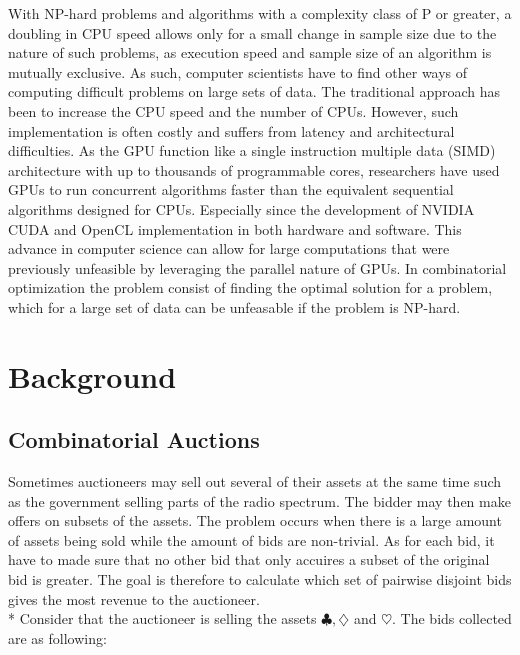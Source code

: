 \documentclass[a4paper, 12pt]{report}
\begin{document}
With NP-hard problems and algorithms with a complexity class of P or greater, 
a doubling in CPU speed allows only for a small change in sample size due to the nature of such problems, 
as execution speed and sample size of an algorithm is mutually exclusive.
As such, computer scientists have to find other ways of computing difficult problems on large sets of data.
The traditional approach has been to increase the CPU speed and the number of CPUs.
However, such implementation is often costly and suffers from latency and architectural difficulties.
As the GPU function like a single instruction multiple data (SIMD) architecture with up to thousands of programmable cores, 
researchers have used GPUs to run concurrent algorithms faster than the equivalent sequential algorithms designed for CPUs. Especially since the development of NVIDIA CUDA and OpenCL implementation in both hardware and software.
This advance in computer science can allow for large computations that were previously unfeasible by leveraging the parallel nature of GPUs. 
In combinatorial optimization the problem consist of finding the optimal solution for a problem, 
which for a large set of data can be unfeasable if the problem is NP-hard.



\section{Background}
\subsection{Combinatorial Auctions}
Sometimes auctioneers may sell out several of their assets at the same time such as the government selling parts of the radio spectrum. The bidder may then make offers on subsets of the assets. The problem occurs when there is a large amount of assets being sold while the amount of bids are non-trivial. As for each bid, 
it have to made sure that no other bid that only accuires a subset of the original bid is greater.
The goal is therefore to calculate which set of pairwise disjoint bids gives the most revenue to the auctioneer.\\*
\newpage
 Consider that the auctioneer is selling the assets $\clubsuit , \diamondsuit$ and $\heartsuit$. The bids collected are as following:
\end{document}
